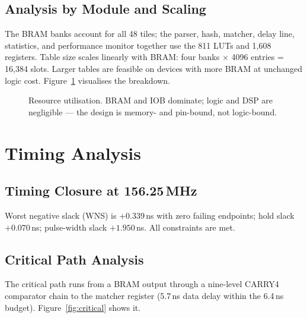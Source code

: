 \documentclass[12pt,twoside,openright]{book}
\begin{document}
\subsection{Analysis by Module and Scaling}

The BRAM banks account for all 48 tiles; the parser, hash, matcher, delay line, statistics, and
performance monitor together use the 811 LUTs and 1{,}608 registers. Table size scales linearly with
BRAM: four banks $\times$ 4096 entries = 16{,}384 slots. Larger tables are feasible on devices with
more BRAM at unchanged logic cost. Figure~\ref{fig:utilchart} visualises the breakdown.

\begin{figure}[H]
\centering
\footnotesize
{}
\caption{Resource utilisation. BRAM and IOB dominate; logic and DSP are negligible --- the design is
memory- and pin-bound, not logic-bound.}
\label{fig:utilchart}
\end{figure}

\section{Timing Analysis}

\subsection{Timing Closure at 156.25\,MHz}

Worst negative slack (WNS) is $+0.339$\,ns with zero failing endpoints; hold slack $+0.070$\,ns;
pulse-width slack $+1.950$\,ns. All constraints are met.

\subsection{Critical Path Analysis}

The critical path runs from a BRAM output through a nine-level CARRY4 comparator chain to the
matcher register (5.7\,ns data delay within the 6.4\,ns budget). Figure~\ref{fig:critical} shows it.
\end{document}
